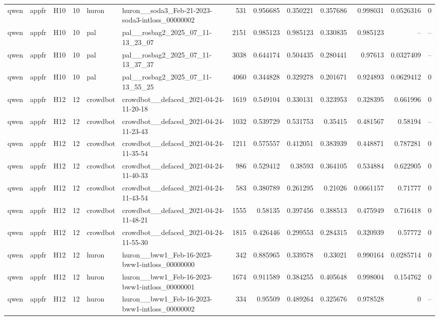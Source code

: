 \begin{longtable}{lllrllrrrrrrr}
qwen & appfr & H10 & 10 & huron & huron\_\_soda3\_Feb-21-2023-soda3-intloss\_00000002 & 531 & 0.956685 & 0.350221 & 0.357686 & 0.998031 & 0.0526316 & 0 \\
qwen & appfr & H10 & 10 & pal & pal\_\_rosbag2\_2025\_07\_11-13\_23\_07 & 2151 & 0.985123 & 0.985123 & 0.330835 & 0.985123 & -- & -- \\
qwen & appfr & H10 & 10 & pal & pal\_\_rosbag2\_2025\_07\_11-13\_37\_37 & 3038 & 0.644174 & 0.504435 & 0.280441 & 0.97613 & 0.0327409 & -- \\
qwen & appfr & H10 & 10 & pal & pal\_\_rosbag2\_2025\_07\_11-13\_55\_25 & 4060 & 0.344828 & 0.329278 & 0.201671 & 0.924893 & 0.0629412 & 0 \\
qwen & appfr & H12 & 12 & crowdbot & crowdbot\_\_defaced\_2021-04-24-11-20-18 & 1619 & 0.549104 & 0.330131 & 0.323953 & 0.328395 & 0.661996 & 0 \\
qwen & appfr & H12 & 12 & crowdbot & crowdbot\_\_defaced\_2021-04-24-11-23-43 & 1032 & 0.539729 & 0.531753 & 0.35415 & 0.481567 & 0.58194 & -- \\
qwen & appfr & H12 & 12 & crowdbot & crowdbot\_\_defaced\_2021-04-24-11-35-54 & 1211 & 0.575557 & 0.412051 & 0.383939 & 0.448871 & 0.787281 & 0 \\
qwen & appfr & H12 & 12 & crowdbot & crowdbot\_\_defaced\_2021-04-24-11-40-33 & 986 & 0.529412 & 0.38593 & 0.364105 & 0.534884 & 0.622905 & 0 \\
qwen & appfr & H12 & 12 & crowdbot & crowdbot\_\_defaced\_2021-04-24-11-43-54 & 583 & 0.380789 & 0.261295 & 0.21026 & 0.0661157 & 0.71777 & 0 \\
qwen & appfr & H12 & 12 & crowdbot & crowdbot\_\_defaced\_2021-04-24-11-48-21 & 1555 & 0.58135 & 0.397456 & 0.388513 & 0.475949 & 0.716418 & 0 \\
qwen & appfr & H12 & 12 & crowdbot & crowdbot\_\_defaced\_2021-04-24-11-55-30 & 1815 & 0.426446 & 0.299553 & 0.284315 & 0.320939 & 0.57772 & 0 \\
qwen & appfr & H12 & 12 & huron & huron\_\_bww1\_Feb-16-2023-bww1-intloss\_00000000 & 342 & 0.885965 & 0.339578 & 0.33021 & 0.990164 & 0.0285714 & 0 \\
qwen & appfr & H12 & 12 & huron & huron\_\_bww1\_Feb-16-2023-bww1-intloss\_00000001 & 1674 & 0.911589 & 0.384255 & 0.405648 & 0.998004 & 0.154762 & 0 \\
qwen & appfr & H12 & 12 & huron & huron\_\_bww1\_Feb-16-2023-bww1-intloss\_00000002 & 334 & 0.95509 & 0.489264 & 0.325676 & 0.978528 & 0 & -- \\

\end{longtable}
